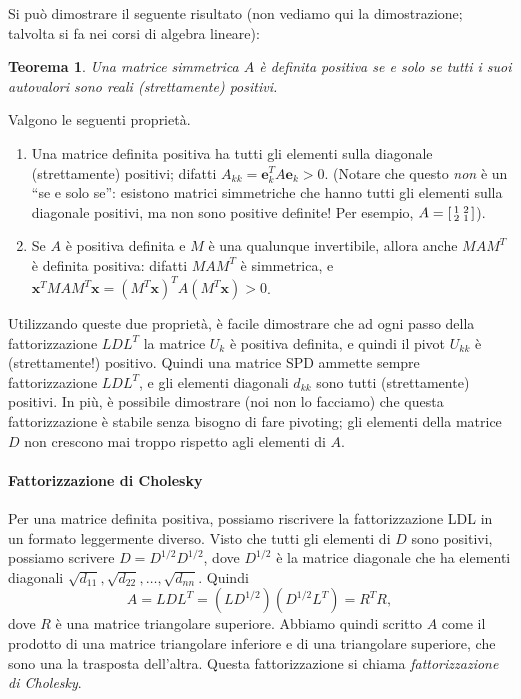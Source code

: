 \documentclass[a4paper]{report}
\newtheorem{theorem}{Teorema}[chapter]
\theoremstyle{definiton}
\theoremstyle{remark}
\begin{document}
Si può dimostrare il seguente risultato (non vediamo qui la dimostrazione; talvolta si fa nei corsi di algebra lineare):
\begin{theorem}
Una matrice simmetrica $A$ è definita positiva se e solo se tutti i suoi autovalori sono reali (strettamente) positivi. 
\end{theorem}
Valgono le seguenti proprietà.
\begin{enumerate}
    \item Una matrice definita positiva ha tutti gli elementi sulla diagonale (strettamente) positivi; difatti $A_{kk} = \mathbf{e}_k^T A \mathbf{e}_k > 0$. (Notare che questo \emph{non} è un ``se e solo se'': esistono matrici simmetriche che hanno tutti gli elementi sulla diagonale positivi, ma non sono positive definite! Per esempio, $A = \begin{bsmallmatrix}
        1 & 2\\ 2 & 1
    \end{bsmallmatrix}$).
    \item Se $A$ è positiva definita e $M$ è una qualunque invertibile, allora anche $MAM^T$ è definita positiva: difatti $MAM^T$ è simmetrica, e $\mathbf{x}^T MAM^T \mathbf{x} = (M^T\mathbf{x})^T A (M^T\mathbf{x}) > 0$.
\end{enumerate}
Utilizzando queste due proprietà, è facile dimostrare che ad ogni passo della fattorizzazione $LDL^T$ la matrice $U_k$ è positiva definita, e quindi il pivot $U_{kk}$ è (strettamente!) positivo. Quindi una matrice SPD ammette sempre fattorizzazione $LDL^T$, e gli elementi diagonali $d_{kk}$ sono tutti (strettamente) positivi. In più, è possibile dimostrare (noi non lo facciamo) che questa fattorizzazione è stabile senza bisogno di fare pivoting; gli elementi della matrice $D$ non crescono mai troppo rispetto agli elementi di $A$.

\paragraph{Fattorizzazione di Cholesky}
Per una matrice definita positiva, possiamo riscrivere la fattorizzazione LDL in un formato leggermente diverso. Visto che tutti gli elementi di $D$ sono positivi, possiamo scrivere $D = D^{1/2} D^{1/2}$, dove $D^{1/2}$ è la matrice diagonale che ha elementi diagonali $\sqrt{d_{11}}, \sqrt{d_{22}}, \dots, \sqrt{d_{nn}}$. Quindi
\[
A = LDL^T = (LD^{1/2})(D^{1/2}L^T) = R^TR,
\]
dove $R$ è una matrice triangolare superiore. Abbiamo quindi scritto $A$ come il prodotto di una matrice triangolare inferiore e di una triangolare superiore, che sono una la trasposta dell'altra. Questa fattorizzazione si chiama \emph{fattorizzazione di Cholesky}. 
\end{document}
